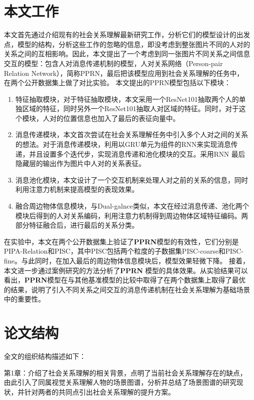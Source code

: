 \section{本文工作}

本文首先通过介绍现有的社会关系理解最新研究工作，分析它们的模型设计的出发点，模型的结构，分析这些工作的忽略的信息，即没考虑到整张图片不同的人对的关系之间的互相影响。因此，本文提出了一个考虑到同一张图片不同关系之间信息交互的模型：包含人对消息传递机制的模型，人对关系网络（Person-pair Relation Network），简称PPRN，最后把该模型应用到社会关系理解的任务中，在两个公开数据集上做了对比实验。
本文提出的PPRN模型包括以下模块：
\begin{enumerate}
    \item 特征抽取模块，对于特征抽取模块，本文采用一个ResNet101\cite{he2016deep}抽取两个人的单独区域的特征，同时另外一个ResNet101抽取人对区域的特征。同时，对于这个模块，人对的位置信息也加入了最后的表征向量中。
    \item 消息传递模块，本文首次尝试在社会关系理解任务中引入多个人对之间的关系的想法。对于消息传递模块，利用以GRU单元为组件的RNN来实现消息传递，并且设置多个迭代步，实现消息传递和池化模块的交互。采用RNN 最后隐藏层的输出作为图片中人对的关系表征。
    \item 消息池化模块，本文设计了一个交互机制来处理人对之前的关系的信息，同时利用注意力机制来提高模型的表现效果。
    \item 融合周边物体信息模块，与Dual-galnce\cite{li2017dual-glance}类似，本文在经过消息传递、池化两个模块后得到的人对关系编码，利用注意力机制得到周边物体区域特征编码。两部分特征融合后，进行最后的关系分类。
\end{enumerate}
在实验中，本文在两个公开数据集上验证了\textbf{PPRN}模型的有效性，它们分别是PIPA-Relation和PISC，其中PISC包括两个粒度的子数据集PISC-coarse和PISC-fine。与此同时，在加入最后的周边物体信息模块后，模型效果轻微下降。
接着，本文进一步通过案例研究的方法分析了\textbf{PPRN} 模型的具体效果。从实验结果可以看出，\textbf{PPRN}模型在与其他基准模型的比较中取得了在两个数据集上取得了最优的结果，说明了引入不同关系之间交互的消息传递机制在社会关系理解为基础场景中的重要性。

\section{论文结构}

全文的组织结构描述如下：

第1章：介绍了社会关系理解的相关背景，点明了当前社会关系理解存在的缺点，由此引入了同属视觉关系理解人物的场景图谱，分析并总结了场景图谱的研究现状，并针对两者的共同点引出社会关系理解的提升方案。


